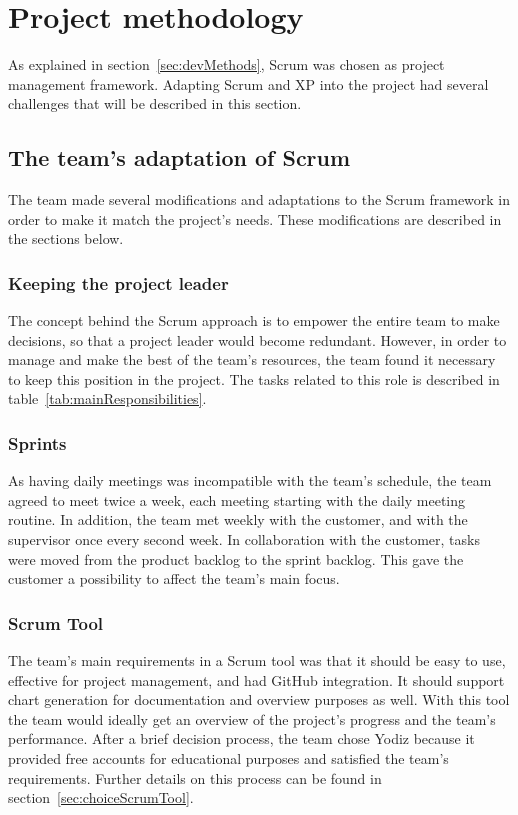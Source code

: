 \newpage
\section{Project methodology}
\label{sec:scrumDevProcess}

As explained in section~\ref{sec:devMethods}, Scrum was chosen as project management framework. Adapting Scrum and XP into the project had several challenges that will be described in this section.

\subsection{The team's adaptation of Scrum}
The team made several modifications and adaptations to the Scrum framework in order to make it match the project's needs. These modifications are described in the sections below.

\subsubsection{Keeping the project leader}
The concept behind the Scrum approach is to empower the entire team to make decisions, so that a project leader would become redundant. However, in order to manage and make the best of the team's resources, the team found it necessary to keep this position in the project. The tasks related to this role is described in table~\ref{tab:mainResponsibilities}.

\subsubsection{Sprints}
As having daily meetings was incompatible with the team's schedule, the team agreed to meet twice a week, each meeting starting with the daily meeting routine. In addition, the team met weekly with the customer, and with the supervisor once every second week. In collaboration with the customer, tasks were moved from the product backlog to the sprint backlog. This gave the customer a possibility to affect the team's main focus.

\subsubsection{Scrum Tool}
\label{sec:scrumtool}
The team's main requirements in a Scrum tool was that it should be easy to use, effective for project management, and had GitHub integration. It should support chart generation for documentation and overview purposes as well. With this tool the team would ideally get an overview of the project's progress and the team's performance. After a brief decision process, the team chose Yodiz because it provided free accounts for educational purposes and satisfied the team's requirements. Further details on this process can be found in section~\ref{sec:choiceScrumTool}.

